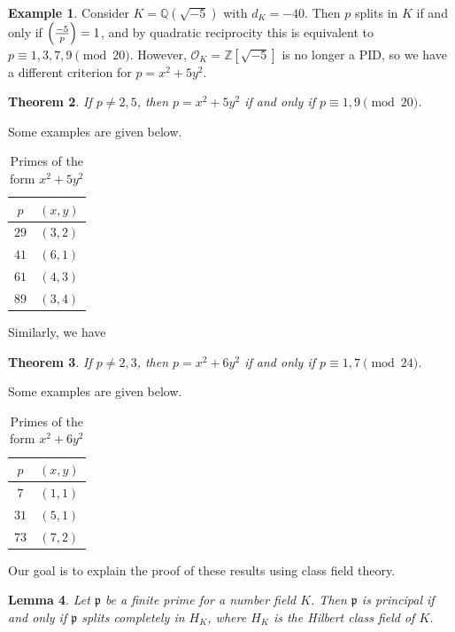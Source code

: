 \documentclass[leqno, openany]{memoir}
\newtheorem{thm}{Theorem}[section]
\newtheorem{lem}[thm]{Lemma}
\theoremstyle{definition}
\newtheorem{exm}[thm]{Example}
\theoremstyle{remark}
\theoremstyle{plain}
\theoremstyle{definition}
\theoremstyle{remark}
\newcommand{\Z}{\mathbb{Z}}
\newcommand{\Q}{\mathbb{Q}}
\newcommand{\mc}[1]{\mathcal{#1}}
\newcommand{\mf}[1]{\mathfrak{#1}}
\begin{document}
\begin{exm}
    Consider $K = \Q(\sqrt{-5})$ with $d_K = -40$. Then $p$ splits in $K$ if and only if $\qty(\frac{-5}{p}) = 1$, and by quadratic reciprocity this is equivalent to $p \equiv 1,3,7,9 \pmod{20}$. However, $\mc{O}_K = \Z[\sqrt{-5}]$ is no longer a PID, so we have a different criterion for $p = x^2 + 5y^2$. 
\end{exm}

\begin{thm}
    If $p \neq 2,5$, then $p=x^2 + 5y^2$ if and only if $p \equiv 1,9 \pmod{20}$.
\end{thm}

    Some examples are given below.
    \begin{table}[H]
        \centering
        \caption{Primes of the form $x^2 + 5y^2$}
        \label{tab:primes-form}
        \begin{tabular}{cc}
        \toprule
        $p$ & $(x,y)$ \\
        \midrule
        $29$ & $(3,2)$ \\
        $41$ & $(6,1)$ \\
        $61$ & $(4,3)$ \\
        $89$ & $(3,4)$ \\
        \bottomrule
        \end{tabular}
    \end{table}

Similarly, we have
\begin{thm}
    If $p \neq 2,3$, then $p = x^2 + 6y^2$ if and only if $p \equiv 1,7 \pmod{24}$.
\end{thm}

Some examples are given below.
\begin{table}[H]
    \centering
    \caption{Primes of the form $x^2 + 6y^2$}
    \label{tab:primes-form-2}
    \begin{tabular}{cc}
    \toprule
    $p$ & $(x,y)$ \\
    \midrule
    $7$ & $(1,1)$ \\
    $31$ & $(5,1)$ \\
    $73$ & $(7,2)$ \\
    \bottomrule
    \end{tabular}
\end{table}

Our goal is to explain the proof of these results using class field theory.

\begin{lem}
    Let $\mf{p}$ be a finite prime for a number field $K$. Then $\mf{p}$ is principal if and only if $\mf{p}$ splits completely in $H_K$, where $H_K$ is the Hilbert class field of $K$.
\end{lem}
\end{document}
